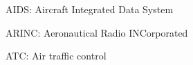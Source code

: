 





      AIDS: Aircraft Integrated Data System

	ARINC: Aeronautical Radio INCorporated 

 ATC: Air traffic control

